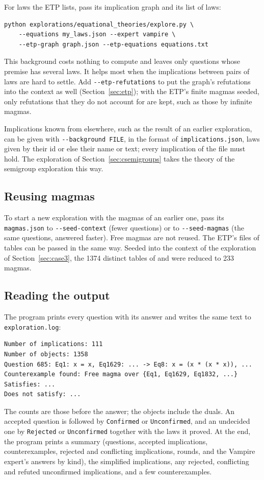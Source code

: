 \documentclass[11pt,a4paper]{article}
\theoremstyle{definition}
\theoremstyle{remark}
\newcommand{\code}[1]{\texttt{#1}}
\begin{document}
For laws the ETP lists, pass its implication graph and its list of laws:
\begin{Verbatim}
python explorations/equational_theories/explore.py \
    --equations my_laws.json --expert vampire \
    --etp-graph graph.json --etp-equations equations.txt
\end{Verbatim}
This background costs nothing to compute and leaves only questions whose premise has several laws. It helps most when the implications between pairs of laws are hard to settle. Add \code{-{}-etp-refutations} to put the graph's refutations into the context as well (Section~\ref{sec:etp}); with the ETP's finite magmas seeded, only refutations that they do not account for are kept, such as those by infinite magmas.

Implications known from elsewhere, such as the result of an earlier exploration, can be given with \code{-{}-background FILE}, in the format of \code{implications.json}, laws given by their id or else their name or text; every implication of the file must hold. The exploration of Section~\ref{sec:csemigroups} takes the theory of the semigroup exploration this way.

\subsection{Reusing magmas}

To start a new exploration with the magmas of an earlier one, pass its \code{magmas.json} to \code{-{}-seed-context} (fewer questions) or to \code{-{}-seed-magmas} (the same questions, answered faster). Free magmas are not reused. The ETP's files of tables can be passed in the same way. Seeded into the context of the exploration of Section~\ref{sec:case3}, the 1374 distinct tables of  and  were reduced to 233 magmas.

\subsection{Reading the output}

The program prints every question with its answer and writes the same text to \code{exploration.log}:
\begin{Verbatim}
Number of implications: 111
Number of objects: 1358
Question 685: Eq1: x = x, Eq1629: ... -> Eq8: x = (x * (x * x)), ...
Counterexample found: Free magma over {Eq1, Eq1629, Eq1832, ...}
Satisfies: ...
Does not satisfy: ...
\end{Verbatim}
The counts are those before the answer; the objects include the duals. An accepted question is followed by \code{Confirmed} or \code{Unconfirmed}, and an undecided one by \code{Rejected} or \code{Unconfirmed} together with the laws it proved. At the end, the program prints a summary (questions, accepted implications, counterexamples, rejected and conflicting implications, rounds, and the Vampire expert's answers by kind), the simplified implications, any rejected, conflicting and refuted unconfirmed implications, and a few counterexamples.
\end{document}
